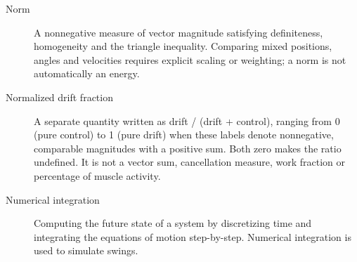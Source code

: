 \begin{description}
\item[Norm] A nonnegative measure of vector magnitude satisfying definiteness, homogeneity and the triangle inequality. Comparing mixed positions, angles and velocities requires explicit scaling or weighting; a norm is not automatically an energy.

\item[Normalized drift fraction] A separate quantity written as drift / (drift + control), ranging from 0 (pure control) to 1 (pure drift) when these labels denote nonnegative, comparable magnitudes with a positive sum. Both zero makes the ratio undefined. It is not a vector sum, cancellation measure, work fraction or percentage of muscle activity.

\item[Numerical integration] Computing the future state of a system by discretizing time and integrating the equations of motion step-by-step. Numerical integration is used to simulate swings.

\end{description}
